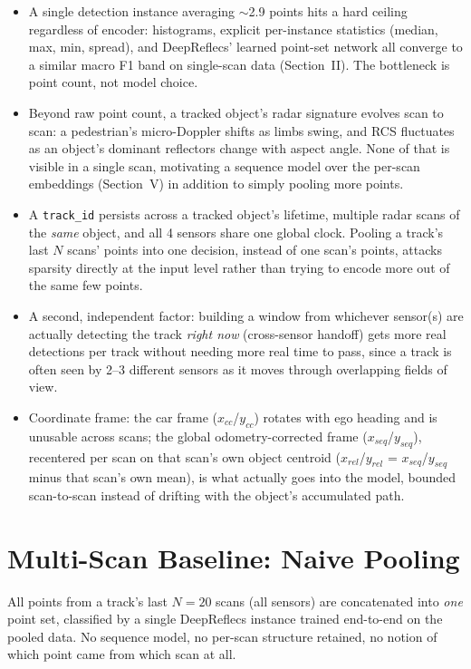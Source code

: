 \documentclass[10pt,letterpaper]{IEEEtran}
\begin{document}
\begin{itemize}
\item A single detection instance averaging $\sim$2.9 points hits a hard
  ceiling regardless of encoder: histograms, explicit per-instance statistics
  (median, max, min, spread), and DeepReflecs' learned point-set network all
  converge to a similar macro F1 band on single-scan data (Section~II). The
  bottleneck is point count, not model choice.
\item Beyond raw point count, a tracked object's radar signature evolves scan
  to scan: a pedestrian's micro-Doppler shifts as limbs swing, and RCS
  fluctuates as an object's dominant reflectors change with aspect angle.
  None of that is visible in a single scan, motivating a sequence model over
  the per-scan embeddings (Section~V) in addition to simply pooling more
  points.
\item A \texttt{track\_id} persists across a tracked object's lifetime,
  multiple radar scans of the \emph{same} object, and all 4 sensors share one
  global clock. Pooling a track's last $N$ scans' points into one decision,
  instead of one scan's points, attacks sparsity directly at the input level
  rather than trying to encode more out of the same few points.
\item A second, independent factor: building a window from whichever
  sensor(s) are actually detecting the track \emph{right now}
  (cross-sensor handoff) gets more real detections per track without needing
  more real time to pass, since a track is often seen by 2--3 different
  sensors as it moves through overlapping fields of view.
\item Coordinate frame: the car frame ($x_{cc}$/$y_{cc}$) rotates with ego
  heading and is unusable across scans; the global odometry-corrected frame
  ($x_{seq}$/$y_{seq}$), recentered per scan on that scan's own object
  centroid ($x_{rel}$/$y_{rel}$ = $x_{seq}$/$y_{seq}$ minus that scan's own
  mean), is what actually goes into the model, bounded scan-to-scan instead of
  drifting with the object's accumulated path.
\end{itemize}

\section{Multi-Scan Baseline: Naive Pooling}

All points from a track's last $N=20$ scans (all sensors) are concatenated
into \emph{one} point set, classified by a single DeepReflecs instance
trained end-to-end on the pooled data. No sequence model, no per-scan
structure retained, no notion of which point came from which scan at all.
\end{document}
